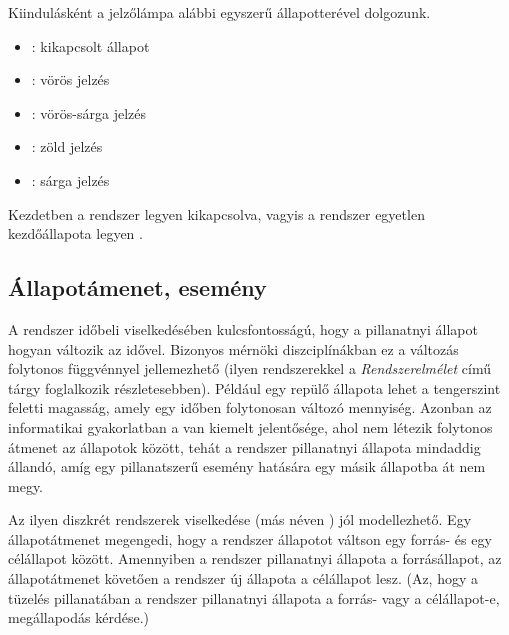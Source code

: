 \begin{megjegyzes}
Kiindulásként a jelzőlámpa alábbi egyszerű állapotterével dolgozunk.
 
\begin{itemize}
\item {}: kikapcsolt állapot
\item {}: vörös jelzés
\item {}: vörös-sárga jelzés
\item {}: zöld jelzés
\item {}: sárga jelzés
\end{itemize}

Kezdetben a rendszer legyen kikapcsolva, vagyis a rendszer egyetlen kezdőállapota legyen .
\end{megjegyzes}

\subsection{Állapotámenet, esemény}

A rendszer időbeli viselkedésében kulcsfontosságú, hogy a pillanatnyi állapot hogyan változik az idővel. Bizonyos mérnöki diszciplínákban ez a változás folytonos függvénnyel jellemezhető (ilyen rendszerekkel a \emph{Rendszerelmélet} című tárgy foglalkozik részletesebben). Például egy repülő állapota lehet a tengerszint feletti magasság, amely egy időben folytonosan változó mennyiség. Azonban az informatikai gyakorlatban a  van kiemelt jelentősége, ahol nem létezik folytonos átmenet az állapotok között, tehát a rendszer pillanatnyi állapota mindaddig állandó, amíg egy pillanatszerű esemény hatására egy másik állapotba át nem megy.

Az ilyen diszkrét rendszerek viselkedése  (más néven ) jól modellezhető. Egy állapotátmenet megengedi, hogy a rendszer állapotot váltson egy forrás- és egy célállapot között. Amennyiben a rendszer pillanatnyi állapota a forrásállapot, az állapotátmenet  követően a rendszer új állapota a célállapot lesz. (Az, hogy a tüzelés pillanatában a rendszer pillanatnyi állapota a forrás- vagy a célállapot-e, megállapodás kérdése.)

